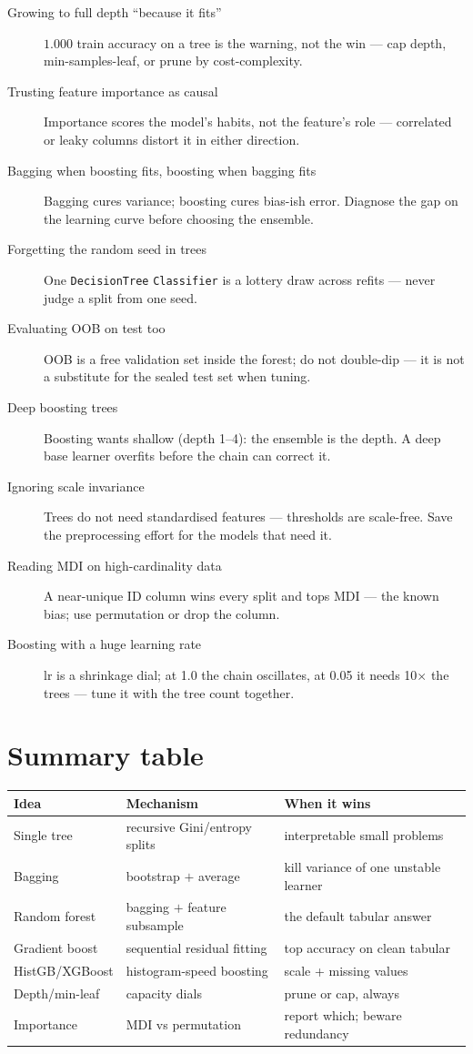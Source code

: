 \begin{description}
\item[Growing to full depth ``because it fits''] $1.000$ train accuracy
  on a tree is the warning, not the win --- cap depth, min-samples-leaf,
  or prune by cost-complexity.
\item[Trusting feature importance as causal] Importance scores the
  model's habits, not the feature's role --- correlated or leaky columns
  distort it in either direction.
\item[Bagging when boosting fits, boosting when bagging fits] Bagging
  cures variance; boosting cures bias-ish error. Diagnose the gap on the
  learning curve before choosing the ensemble.
\item[Forgetting the random seed in trees] One
  \texttt{DecisionTree} \texttt{Classifier} is a lottery draw across
  refits --- never judge a split from one seed.
\item[Evaluating OOB on test too] OOB is a free
  validation set inside the forest; do not double-dip --- it is not a
  substitute for the sealed test set when tuning.
\item[Deep boosting trees] Boosting wants shallow (depth 1--4): the
  ensemble is the depth. A deep base learner overfits before the chain
  can correct it.
\item[Ignoring scale invariance] Trees do not need standardised
  features --- thresholds are scale-free. Save the preprocessing effort
  for the models that need it.
\item[Reading MDI on high-cardinality data] A near-unique ID column wins
  every split and tops MDI --- the known bias; use permutation or drop
  the column.
\item[Boosting with a huge learning rate] lr is a shrinkage dial; at
  1.0 the chain oscillates, at 0.05 it needs 10$\times$ the trees ---
  tune it with the tree count together.
\end{description}

\section{Summary table}

\begin{tabularx}{\linewidth}{@{}l l X@{}}
\toprule
\textbf{Idea} & \textbf{Mechanism} & \textbf{When it wins}\\
\midrule
Single tree & recursive Gini/entropy splits & interpretable small problems\\
Bagging & bootstrap $+$ average & kill variance of one unstable learner\\
Random forest & bagging $+$ feature subsample & the default tabular answer\\
Gradient boost & sequential residual fitting & top accuracy on clean tabular\\
HistGB/XGBoost & histogram-speed boosting & scale + missing values\\
Depth/min-leaf & capacity dials & prune or cap, always\\
Importance & MDI vs permutation & report which; beware redundancy\\
\bottomrule
\end{tabularx}


